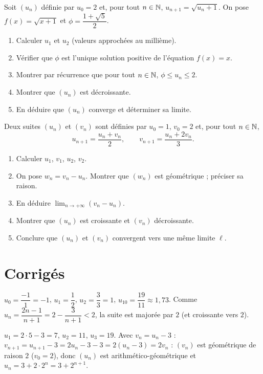 Soit $(u_n)$ définie par $u_0=2$ et, pour tout $n\in\mathbb{N}$, $u_{n+1}=\sqrt{u_n+1}$.
On pose $f(x)=\sqrt{x+1}$ et $\phi=\dfrac{1+\sqrt5}{2}$.
\begin{enumerate}[label=\arabic*)]
\item Calculer $u_1$ et $u_2$ (valeurs approchées au millième).
\item Vérifier que $\phi$ est l'unique solution positive de l'équation $f(x)=x$.
\item Montrer par récurrence que pour tout $n\in\mathbb{N}$, $\phi\le u_n\le2$.
\item Montrer que $(u_n)$ est décroissante.
\item En déduire que $(u_n)$ converge et déterminer sa limite.
\end{enumerate}

Deux suites $(u_n)$ et $(v_n)$ sont définies par $u_0=1$, $v_0=2$ et, pour tout $n\in\mathbb{N}$,
\[
u_{n+1}=\frac{u_n+v_n}{2},\qquad v_{n+1}=\frac{u_n+2v_n}{3}.
\]
\begin{enumerate}[label=\arabic*)]
\item Calculer $u_1$, $v_1$, $u_2$, $v_2$.
\item On pose $w_n=v_n-u_n$. Montrer que $(w_n)$ est géométrique ; préciser sa raison.
\item En déduire $\displaystyle\lim_{n\to+\infty}(v_n-u_n)$.
\item Montrer que $(u_n)$ est croissante et $(v_n)$ décroissante.
\item Conclure que $(u_n)$ et $(v_n)$ convergent vers une même limite $\ell$.
\end{enumerate}

\section{Corrigés}

$u_0=\dfrac{-1}{1}=-1$, $u_1=\dfrac{1}{2}$, $u_2=\dfrac{3}{3}=1$, $u_{10}=\dfrac{19}{11}\approx1{,}73$.
Comme $u_n=\dfrac{2n-1}{n+1}=2-\dfrac{3}{n+1}<2$, la suite est majorée par $2$ (et croissante vers $2$).

$u_1=2\cdot5-3=7$, $u_2=11$, $u_3=19$. Avec $v_n=u_n-3$ :
$v_{n+1}=u_{n+1}-3=2u_n-3-3=2(u_n-3)=2v_n$ : $(v_n)$ est géométrique de raison $2$
($v_0=2$), donc $(u_n)$ est arithmético-géométrique et $u_n=3+2\cdot2^n=3+2^{n+1}$.

